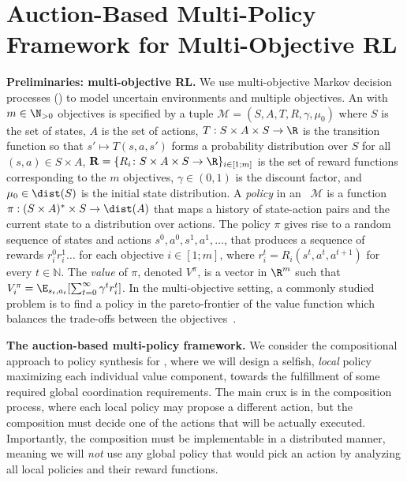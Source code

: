 \section{Auction-Based Multi-Policy Framework for Multi-Objective RL}

\textbf{Preliminaries: multi-objective RL.}
We use multi-objective Markov decision processes (\momdp) to model uncertain environments and multiple objectives. 
An \momdp with \(m \in \N_{>0}\) objectives is specified by a tuple \(\mathcal{M} = (S, A, T, R, \gamma, \mu_0)\) where \(S\) is the set of states, \(A\) is the set of actions, \(T : S \times A \times S \to \R\) is the transition function so that \(s' \mapsto T(s, a, s')\) forms a probability distribution over \(S\) for all \((s,a) \in S \times A\), \(\mathbf{R}=\{R_i \colon S \times A \times S \to \R\}_{i\in [1;m]}\) is the set of reward functions corresponding to the \(m\) objectives, $\gamma\in (0,1)$ is the discount factor, and \(\mu_0 \in \dist(S)\) is the initial state distribution. 
A \textit{policy} in an \momdp~\(\mathcal{M}\) is a function \(\pi : (S \times A)^* \times S \to \dist(A)\) that maps a history of state-action pairs and the current state to a distribution over actions.
The policy $\pi$ gives rise to a random sequence of states and actions $s^0,a^0,s^1,a^1,\ldots$, that produces a sequence of rewards $r^0_ir^1_i\ldots$ for each objective $i\in [1;m]$, where $r^t_i = R_i(s^t,a^t,a^{t+1})$ for every $t\in \mathbb{N}$.
The \textit{value} of $\pi$, denoted $V^\pi$, is a vector in $\R^m$ such that $V^\pi_i = \E_{s_t,a_t}[ \sum_{t=0}^\infty \gamma^t r^t_i]$.
In the multi-objective setting, a commonly studied problem is to find a policy in the pareto-frontier of the value function which balances the trade-offs between the objectives~\citep{van2014multi}.

\textbf{The auction-based multi-policy framework.}
We consider the compositional approach to policy synthesis for \momdps, where we will design a selfish, \emph{local} policy maximizing each individual value component, towards the fulfillment of some required global coordination requirements.
The main crux is in the composition process, where each local policy may propose a different action, but the composition must decide one of the actions that will be actually executed.
Importantly, the composition must be implementable in a distributed manner, meaning we will \emph{not} use any global policy that would pick an action by analyzing all local policies and their reward functions.

